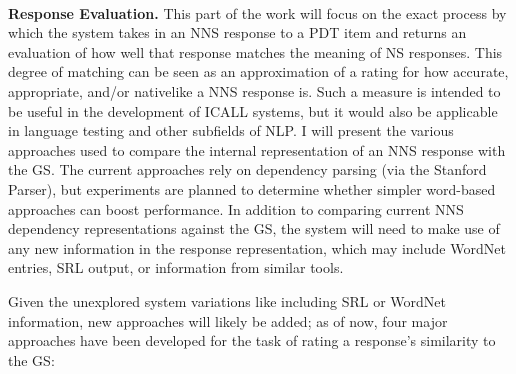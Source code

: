 \documentclass[11pt]{article}
\begin{document}
\\
\textbf{Response Evaluation.} This part of the work will focus on the exact process by which the system takes in an NNS response to a PDT item and returns an evaluation of how well that response matches the meaning of NS responses. This degree of matching can be seen as an approximation of a rating for how accurate, appropriate, and/or nativelike a NNS response is. Such a measure is intended to be useful in the development of ICALL systems, but it would also be applicable in language testing and other subfields of NLP. I will present the various approaches used to compare the internal representation of an NNS response with the GS. The current approaches rely on dependency parsing (via the Stanford Parser), but experiments are planned to determine whether simpler word-based approaches can boost performance. In addition to comparing current NNS dependency representations against the GS, the system will need to make use of any new information in the response representation, which may include WordNet entries, SRL output, or information from similar tools.
\par
Given the unexplored system variations like including SRL or WordNet information, new approaches will likely be added; as of now, four major approaches have been developed for the task of rating a response's similarity to the GS:
\end{document}
